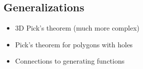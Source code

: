 
\subsection{Generalizations}

\begin{itemize}
\item 3D Pick's theorem (much more complex)
\item Pick's theorem for polygons with holes
\item Connections to generating functions
\end{itemize} 